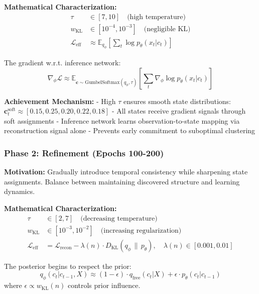 \documentclass[11pt]{article}
\newcommand{\kl}[2]{D_{\text{KL}}\left(#1 \,\|\, #2\right)}
\begin{document}
\textbf{Mathematical Characterization:}
\begin{align}
\tau &\in [7, 10] \quad \text{(high temperature)} \\
w_{\text{KL}} &\in [10^{-4}, 10^{-3}] \quad \text{(negligible KL)} \\
\mathcal{L}_{\text{eff}} &\approx \mathbb{E}_{q_\phi}\left[\sum_t \log p_\theta(x_t|c_t)\right]
\end{align}

The gradient w.r.t. inference network:
\begin{equation}
\nabla_\phi \mathcal{L} \approx \mathbb{E}_{\mathbf{c} \sim \text{GumbelSoftmax}(q_\phi, \tau)}\left[\sum_t \nabla_\phi \log p_\theta(x_t|c_t)\right]
\end{equation}

\textbf{Achievement Mechanism:}
- High $\tau$ ensures smooth state distributions: $\mathbf{c}_t^{\text{soft}} \approx [0.15, 0.25, 0.20, 0.22, 0.18]$
- All states receive gradient signals through soft assignments
- Inference network learns observation-to-state mapping via reconstruction signal alone
- Prevents early commitment to suboptimal clustering

\subsubsection{Phase 2: Refinement (Epochs 100-200)}

\textbf{Motivation:}
Gradually introduce temporal consistency while sharpening state assignments. Balance between maintaining discovered structure and learning dynamics.

\textbf{Mathematical Characterization:}
\begin{align}
\tau &\in [2, 7] \quad \text{(decreasing temperature)} \\
w_{\text{KL}} &\in [10^{-3}, 10^{-2}] \quad \text{(increasing regularization)} \\
\mathcal{L}_{\text{eff}} &= \mathcal{L}_{\text{recon}} - \lambda(n) \cdot \kl{q_\phi}{p_\theta}, \quad \lambda(n) \in [0.001, 0.01]
\end{align}

The posterior begins to respect the prior:
\begin{equation}
q_\phi(c_t|c_{t-1}, X) \approx (1-\epsilon) \cdot q_{\text{free}}(c_t|X) + \epsilon \cdot p_\theta(c_t|c_{t-1})
\end{equation}
where $\epsilon \propto w_{\text{KL}}(n)$ controls prior influence.
\end{document}
